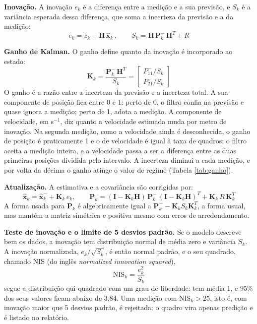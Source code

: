 \documentclass[
    12pt,               %
    openright,          %
    twoside,            %
    a4paper,            %
    chapter=TITLE,      %
    english,            %
    brazil              %
    ]{abntex2}
\begin{document}
\textbf{Inovação.} A inovação $e_k$ é a diferença entre a medição e a sua previsão, e $S_k$ é a variância esperada dessa diferença, que soma a incerteza da previsão e a da medição:
\begin{equation} \label{eq:kalman_inovacao}
    e_k = z_k - \mathbf{H}\,\hat{\mathbf{x}}_k^-, \qquad
    S_k = \mathbf{H}\,\mathbf{P}_k^-\,\mathbf{H}^T + R
\end{equation}

\textbf{Ganho de Kalman.} O ganho define quanto da inovação é incorporado ao estado:
\begin{equation} \label{eq:kalman_ganho}
    \mathbf{K}_k = \frac{\mathbf{P}_k^-\,\mathbf{H}^T}{S_k}
    = \begin{bmatrix} P^-_{11}/S_k \\ P^-_{21}/S_k \end{bmatrix}
\end{equation}
O ganho é a razão entre a incerteza da previsão e a incerteza total. A sua componente de posição fica entre 0 e 1: perto de 0, o filtro confia na previsão e quase ignora a medição; perto de 1, adota a medição. A componente de velocidade, em s$^{-1}$, diz quanto a velocidade estimada muda por metro de inovação. Na segunda medição, como a velocidade ainda é desconhecida, o ganho de posição é praticamente 1 e o de velocidade é igual à taxa de quadros: o filtro aceita a medição inteira, e a velocidade passa a ser a diferença entre as duas primeiras posições dividida pelo intervalo. A incerteza diminui a cada medição, e por volta da décima o ganho atinge o valor de regime (Tabela \ref{tab:ganho}).

\textbf{Atualização.} A estimativa e a covariância são corrigidas por:
\begin{equation} \label{eq:kalman_atualizacao}
    \hat{\mathbf{x}}_k = \hat{\mathbf{x}}_k^- + \mathbf{K}_k\,e_k, \qquad
    \mathbf{P}_k = (\mathbf{I} - \mathbf{K}_k\mathbf{H})\,\mathbf{P}_k^-\,(\mathbf{I} - \mathbf{K}_k\mathbf{H})^T + \mathbf{K}_k\,R\,\mathbf{K}_k^T
\end{equation}
A forma usada para $\mathbf{P}_k$ é algebricamente igual a $\mathbf{P}_k^- - \mathbf{K}_k S_k \mathbf{K}_k^T$, a forma usual, mas mantém a matriz simétrica e positiva mesmo com erros de arredondamento.

\textbf{Teste de inovação e o limite de 5 desvios padrão.} Se o modelo descreve bem os dados, a inovação tem distribuição normal de média zero e variância $S_k$. A inovação normalizada, $e_k/\sqrt{S_k}$, é então normal padrão, e o seu quadrado, chamado NIS (do inglês \textit{normalized innovation squared}),
\begin{equation} \label{eq:nis}
    \mathrm{NIS}_k = \frac{e_k^2}{S_k}
\end{equation}
segue a distribuição qui-quadrado com um grau de liberdade: tem média 1, e 95\% dos seus valores ficam abaixo de 3,84. Uma medição com $\mathrm{NIS}_k > 25$, isto é, com inovação maior que 5 desvios padrão, é rejeitada: o quadro vira apenas predição e é listado no relatório.
\end{document}
